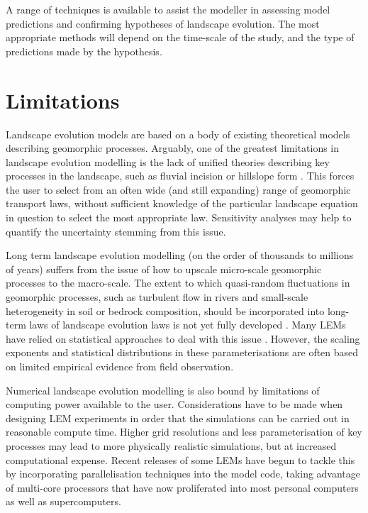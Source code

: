 A range of techniques is available to assist the modeller in assessing model predictions and confirming hypotheses of landscape evolution. The most appropriate methods will depend on the time-scale of the study, and the type of predictions made by the hypothesis. 

\section{Limitations}

Landscape evolution models are based on a body of existing theoretical models describing geomorphic processes. Arguably, one of the greatest limitations in landscape evolution modelling is the lack of unified theories describing key processes in the landscape, such as fluvial incision or hillslope form \citep{dietrich2003geomorphic}. This forces the user to select from an often wide (and still expanding) range of geomorphic transport laws, without sufficient knowledge of the particular landscape equation in question to select the most appropriate law. Sensitivity analyses may help to quantify the uncertainty stemming from this issue.

Long term landscape evolution modelling (on the order of thousands to millions of years) suffers from the issue of how to upscale micro-scale geomorphic processes to the macro-scale. The extent to which quasi-random fluctuations in geomorphic processes, such as turbulent flow in rivers and small-scale heterogeneity in soil or bedrock composition, should be incorporated into long-term laws of landscape evolution laws is not yet fully developed \citep{Tucker2010}. Many LEMs have relied on statistical approaches to deal with this issue \citep{Hovius1997,Lague2005,Lague2013}. However, the scaling exponents and statistical distributions in these parameterisations are often based on limited empirical evidence from field observation.

Numerical landscape evolution modelling is also bound by limitations of computing power available to the user. Considerations have to be made when designing LEM experiments in order that the simulations can be carried out in reasonable compute time. Higher grid resolutions and less parameterisation of key processes may lead to more physically realistic simulations, but at increased computational expense. Recent releases of some LEMs have begun to tackle this by incorporating parallelisation techniques into the model code, taking advantage of multi-core processors that have now proliferated into most personal computers as well as supercomputers.

